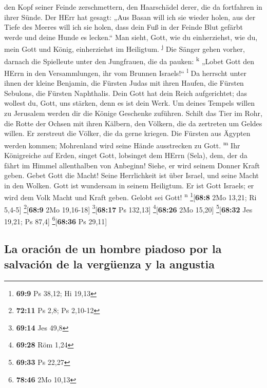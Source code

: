 den Kopf seiner Feinde zerschmettern, den Haarschädel derer, die da
fortfahren in ihrer Sünde.  Der HErr hat gesagt: „Aus
Basan will ich sie wieder holen, aus der Tiefe des Meeres will ich sie
holen,  dass dein Fuß in der Feinde Blut gefärbt werde
und deine Hunde es lecken.``  Man sieht, Gott, wie du
einherziehst, wie du, mein Gott und König, einherziehst im Heiligtum.
\textsuperscript{j}  Die Sänger gehen vorher, darnach die
Spielleute unter den Jungfrauen, die da pauken: \textsuperscript{k}
 „Lobet Gott den HErrn in den Versammlungen, ihr vom
Brunnen Israels!{}`` \textsuperscript{l}  Da herrscht
unter ihnen der kleine Benjamin, die Fürsten Judas mit ihren Haufen, die
Fürsten Sebulons, die Fürsten Naphthalis.  Dein Gott hat
dein Reich aufgerichtet; das wollest du, Gott, uns stärken, denn es ist
dein Werk.  Um deines Tempels willen zu Jerusalem werden
dir die Könige Geschenke zuführen.  Schilt das Tier im
Rohr, die Rotte der Ochsen mit ihren Kälbern, den Völkern, die da
zertreten um Geldes willen. Er zerstreut die Völker, die da gerne
kriegen.  Die Fürsten aus Ägypten werden kommen;
Mohrenland wird seine Hände ausstrecken zu Gott. \textsuperscript{m}
 Ihr Königreiche auf Erden, singet Gott, lobsinget dem
HErrn (Sela),  dem, der da fährt im Himmel allenthalben
von Anbeginn! Siehe, er wird seinem Donner Kraft geben. 
Gebet Gott die Macht! Seine Herrlichkeit ist über Israel, und seine
Macht in den Wolken.  Gott ist wundersam in seinem
Heiligtum. Er ist Gott Israels; er wird dem Volk Macht und Kraft geben.
Gelobt sei Gott! \textsuperscript{n} \footnote{\textbf{69:9} Ps 38,12;
  Hi 19,13}{[}\textbf{68:8} 2Mo 13,21; Ri 5,4-5{]}
\footnote{\textbf{72:11} Ps 2,8; Ps 2,10-12}{[}\textbf{68:9} 2Mo
19,16-18{]} \footnote{\textbf{69:14} Jes 49,8}{[}\textbf{68:17} Ps
132,13{]} \footnote{\textbf{69:28} Röm 1,24}{[}\textbf{68:26} 2Mo
15,20{]} \footnote{\textbf{69:33} Ps 22,27}{[}\textbf{68:32} Jes 19,21;
Ps 87,4{]} \footnote{\textbf{78:46} 2Mo 10,13}{[}\textbf{68:36} Ps
29,11{]}

\hypertarget{la-oraciuxf3n-de-un-hombre-piadoso-por-la-salvaciuxf3n-de-la-verguxfcenza-y-la-angustia}{%
\subsection{La oración de un hombre piadoso por la salvación de la
vergüenza y la
angustia}\label{la-oraciuxf3n-de-un-hombre-piadoso-por-la-salvaciuxf3n-de-la-verguxfcenza-y-la-angustia}}

